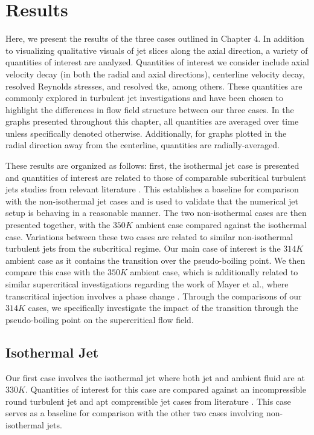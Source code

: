 \chapter{Results}
Here, we present the results of the three cases outlined in Chapter 4. In addition to visualizing qualitative visuals of jet slices along the axial direction, a variety of quantities of interest are analyzed. Quantities of interest we consider include axial velocity decay (in both the radial and axial directions), centerline velocity decay, resolved Reynolds stresses, and resolved \gls{tke}, among others. These quantities are commonly explored in turbulent jet investigations and have been chosen to highlight the differences in flow field structure between our three cases. In the graphs presented throughout this chapter, all quantities are averaged over time unless specifically denoted otherwise. Additionally, for graphs plotted in the radial direction away from the centerline, quantities are radially-averaged. 

These results are organized as follows: first, the isothermal jet case is presented and quantities of interest are related to those of comparable subcritical turbulent jets studies from relevant literature \cite{iso_comp_1, iso_comp_1_ref_1, iso_comp_2}. This establishes a baseline for comparison with the non-isothermal jet cases and is used to validate that the numerical jet setup is behaving in a reasonable manner. The two non-isothermal cases are then presented together, with the $350 K$ ambient case compared against the isothermal case. Variations between these two cases are related to similar non-isothermal turbulent jets from the subcritical regime. Our main case of interest is the $314 K$ ambient case as it contains the transition over the pseudo-boiling point. We then compare this case with the $350 K$ ambient case, which is additionally related to similar supercritical investigations regarding the work of Mayer et al., where transcritical injection involves a phase change \cite{mayer2003raman}. Through the comparisons of our $314 K$  cases, we specifically investigate the impact of the transition through the pseudo-boiling point on the supercritical flow field. 


\section{Isothermal Jet}
Our first case involves the isothermal jet where both jet and ambient fluid are at $330 K$. Quantities of interest for this case are compared against an incompressible round turbulent jet \cite{Pope} and apt compressible jet cases from literature \cite{iso_comp_1, iso_comp_1_ref_1, iso_comp_2}. This case serves as a baseline for comparison with the other two cases involving non-isothermal jets. 

